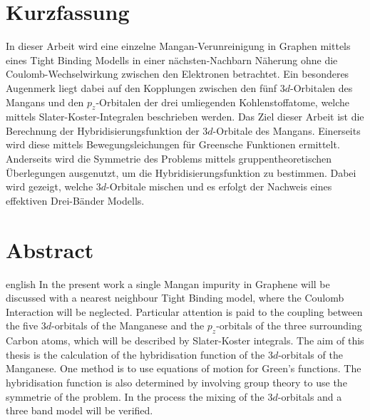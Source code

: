 \thispagestyle{plain}

\section*{Kurzfassung}
In dieser Arbeit wird eine einzelne Mangan-Verunreinigung in Graphen mittels eines Tight Binding Modells in einer nächsten-Nachbarn Näherung
ohne die Coulomb-Wechselwirkung zwischen den Elektronen betrachtet.
Ein besonderes Augenmerk liegt dabei auf den Kopplungen zwischen den fünf $3d$-Orbitalen des Mangans und den $p_z$-Orbitalen der drei umliegenden 
Kohlenstoffatome, welche mittels Slater-Koster-Integralen beschrieben werden.
Das Ziel dieser Arbeit ist die Berechnung der Hybridisierungsfunktion der $3d$-Orbitale des Mangans. 
Einerseits wird diese mittels Bewegungsleichungen für Greensche Funktionen ermittelt.
Anderseits wird die Symmetrie des Problems mittels gruppentheoretischen Überlegungen ausgenutzt, um die Hybridisierungsfunktion zu bestimmen.
Dabei wird gezeigt, welche $3d$-Orbitale mischen und es erfolgt der Nachweis eines effektiven Drei-Bänder Modells.
\section*{Abstract}
\begin{foreignlanguage}{english}
In the present work a single Mangan impurity in Graphene will be discussed with a nearest neighbour Tight Binding model, where
the Coulomb Interaction will be neglected.
Particular attention is paid to the coupling between the five $3d$-orbitals of the Manganese and the $p_z$-orbitals of the three
surrounding Carbon atoms, which will be described by Slater-Koster integrals.
The aim of this thesis is the calculation of the hybridisation function of the $3d$-orbitals of the Manganese.
One method is to use equations of motion for Green's functions. 
The hybridisation function is also determined by involving group theory to use the symmetrie of the problem.
In the process the mixing of the $3d$-orbitals and a three band model will be verified. 
\end{foreignlanguage}
